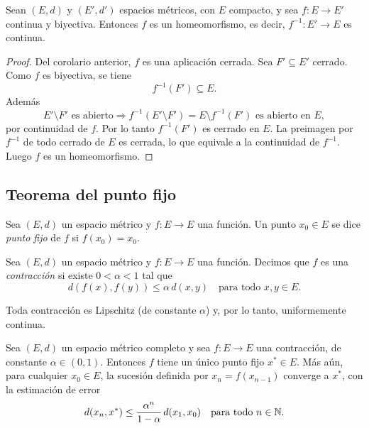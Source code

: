\begin{cor}
Sean $(E,d)$ y $(E',d')$ espacios métricos, con $E$ compacto, y sea
$f : E \to E'$ continua y biyectiva. Entonces $f$ es un homeomorfismo,
es decir, $f^{-1} : E' \to E$ es continua.
\end{cor}

\begin{proof}
Del corolario anterior, $f$ es una aplicación cerrada.
Sea $F' \subseteq E'$ cerrado. Como $f$ es biyectiva, se tiene
\[
f^{-1}(F') \subseteq E.
\]
Además
\[
E' \setminus F' \text{ es abierto} \Rightarrow
f^{-1}(E'\setminus F') = E \setminus f^{-1}(F')
\text{ es abierto en }E,
\]
por continuidad de $f$. Por lo tanto $f^{-1}(F')$ es cerrado en $E$.
La preimagen por $f^{-1}$ de todo cerrado de $E$ es cerrada, lo que
equivale a la continuidad de $f^{-1}$. Luego $f$ es un homeomorfismo.
\end{proof}

\subsection{Teorema del punto fijo}

\begin{defi}
Sea $(E,d)$ un espacio métrico y $f : E \to E$ una función. Un punto
$x_0 \in E$ se dice \emph{punto fijo} de $f$ si $f(x_0)=x_0$.
\end{defi}

\begin{defi}[Contracción]
Sea $(E,d)$ un espacio métrico y $f : E \to E$ una función. Decimos que
$f$ es una \emph{contracción} si existe $0<\alpha<1$ tal que
\[
d(f(x),f(y)) \le \alpha\, d(x,y) \quad \text{para todo } x,y \in E.
\]
\end{defi}

\begin{obs}
Toda contracción es Lipschitz (de constante $\alpha$) y, por lo tanto,
uniformemente continua.
\end{obs}

\begin{teo}
Sea $(E,d)$ un espacio métrico completo y sea $f : E \to E$ una
contracción, de constante $\alpha \in (0,1)$. Entonces $f$ tiene un único
punto fijo $x^* \in E$. Más aún, para cualquier $x_0 \in E$, la sucesión
definida por $x_n = f(x_{n-1})$ converge a $x^*$, con la estimación de
error
\[
d(x_n, x^*) \le \frac{\alpha^n}{1-\alpha}\, d(x_1,x_0)
\quad \text{para todo } n \in \mathbb{N}.
\]
\end{teo}

